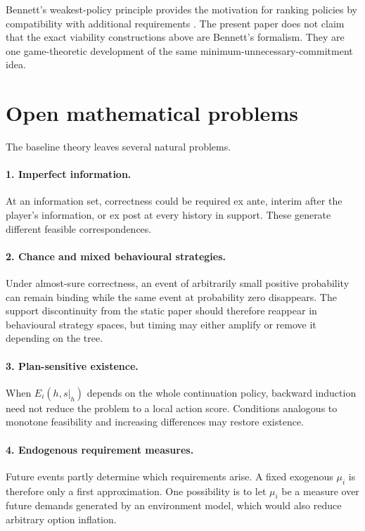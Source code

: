 \documentclass[11pt]{article}
\theoremstyle{definition}
\begin{document}
Bennett's weakest-policy principle provides the motivation for ranking policies by compatibility with additional requirements \cite{bennett2023,bennett2025}. The present paper does not claim that the exact viability constructions above are Bennett's formalism. They are one game-theoretic development of the same minimum-unnecessary-commitment idea.

\section{Open mathematical problems}

The baseline theory leaves several natural problems.

\paragraph{1. Imperfect information.}
At an information set, correctness could be required ex ante, interim after the player's information, or ex post at every history in support. These generate different feasible correspondences.

\paragraph{2. Chance and mixed behavioural strategies.}
Under almost-sure correctness, an event of arbitrarily small positive probability can remain binding while the same event at probability zero disappears. The support discontinuity from the static paper should therefore reappear in behavioural strategy spaces, but timing may either amplify or remove it depending on the tree.

\paragraph{3. Plan-sensitive existence.}
When $E_i(h,s|_h)$ depends on the whole continuation policy, backward induction need not reduce the problem to a local action score. Conditions analogous to monotone feasibility and increasing differences may restore existence.

\paragraph{4. Endogenous requirement measures.}
Future events partly determine which requirements arise. A fixed exogenous $\mu_i$ is therefore only a first approximation. One possibility is to let $\mu_i$ be a measure over future demands generated by an environment model, which would also reduce arbitrary option inflation.
\end{document}
